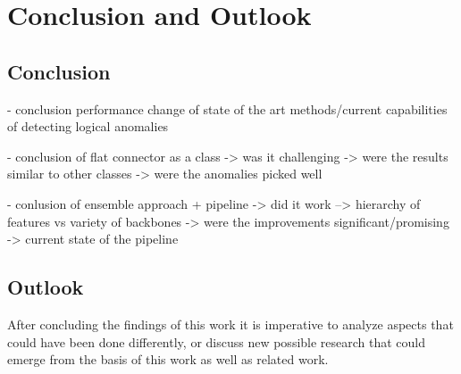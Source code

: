 \chapter{Conclusion and Outlook}
\label{chap:conclusion}


\section{Conclusion}
\label{sec:realconclusion}

- conclusion performance change of state of the art methods/current capabilities of detecting logical anomalies\newline

- conclusion of flat connector as a class\newline
-> was it challenging\newline
-> were the results similar to other classes\newline
-> were the anomalies picked well%

- conlusion of ensemble approach + pipeline\newline
-> did it work\newline
--> hierarchy of features vs variety of backbones\newline
-> were the improvements significant/promising\newline
-> current state of the pipeline\newline




\section{Outlook}
\label{sec:finaloutlook}

After concluding the findings of this work it is imperative to analyze aspects that could have been done differently, or discuss new possible research that could emerge from 
the basis of this work as well as related work.\newline

